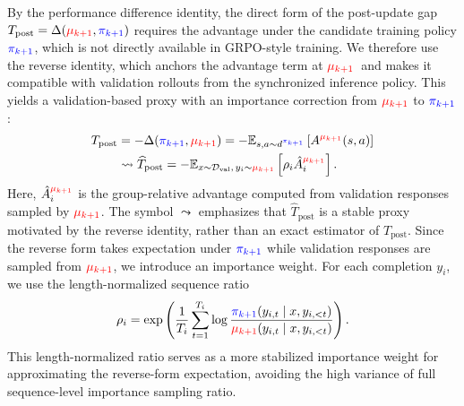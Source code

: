 By the performance difference identity, the direct form of the post-update gap 
$T_{\mathrm{post}}=\Delta(\textcolor{red}{\mu_{k+1}},\textcolor{blue}{\pi_{k+1}})$ 
requires the advantage under the candidate training policy $\textcolor{blue}{\pi_{k+1}}$, which is not directly available in GRPO-style training. 
We therefore use the reverse identity, which anchors the advantage term at \(\textcolor{red}{\mu_{k+1}}\)\ and makes it compatible with validation rollouts from the synchronized inference policy.
This yields a validation-based proxy with an importance correction from \(\textcolor{red}{\mu_{k+1}}\) to \(\textcolor{blue}{\pi_{k+1}}\):
\begin{equation}
\begin{aligned}
    T_{\mathrm{post}}
    &=
    -
    \Delta(\textcolor{blue}{\pi_{k+1}}, \textcolor{red}{\mu_{k+1}})
    =
    -
    \mathbb{E}_{s,a\sim d^{\textcolor{blue}{\pi_{k+1}}}}
    \left[
        A^{\textcolor{red}{\mu_{k+1}}}(s,a)
    \right] \\
    &\leadsto
    \widehat{T}_{\mathrm{post}}
    =
    -
    \mathbb{E}_{x\sim\mathcal{D}_{\mathrm{val}},\,y_i\sim\textcolor{red}{\mu_{k+1}}}
    \left[
        \rho_i
        \hat{A}^{\textcolor{red}{\mu_{k+1}}}_i
    \right].
\end{aligned}
\label{eq:post_gap_proxy}
\end{equation}
Here, $\hat{A}^{\textcolor{red}{\mu_{k+1}}}_i$ is the group-relative advantage computed from validation responses sampled by $\textcolor{red}{\mu_{k+1}}$. 
The symbol $\leadsto$ emphasizes that $\widehat{T}_{\mathrm{post}}$ is a stable proxy motivated by the reverse identity, rather than an exact estimator of $T_{\mathrm{post}}$. 
Since the reverse form takes expectation under $\textcolor{blue}{\pi_{k+1}}$ while validation responses are sampled from $\textcolor{red}{\mu_{k+1}}$, we introduce an importance weight. 
For each completion $y_i$, we use the length-normalized sequence ratio
\begin{equation}
    \rho_i
    =
    \exp
    \left(
        \frac{1}{T_i}
        \sum_{t=1}^{T_i}
        \log
        \frac{
            \textcolor{blue}{\pi_{k+1}}(y_{i,t}\mid x,y_{i,<t})
        }{
            \textcolor{red}{\mu_{k+1}}(y_{i,t}\mid x,y_{i,<t})
        }
    \right).
    \label{eq:geometric_sequence_ratio}
\end{equation}
This length-normalized ratio serves as a more stabilized importance weight for approximating the reverse-form expectation, avoiding the high variance of full sequence-level importance sampling ratio.

